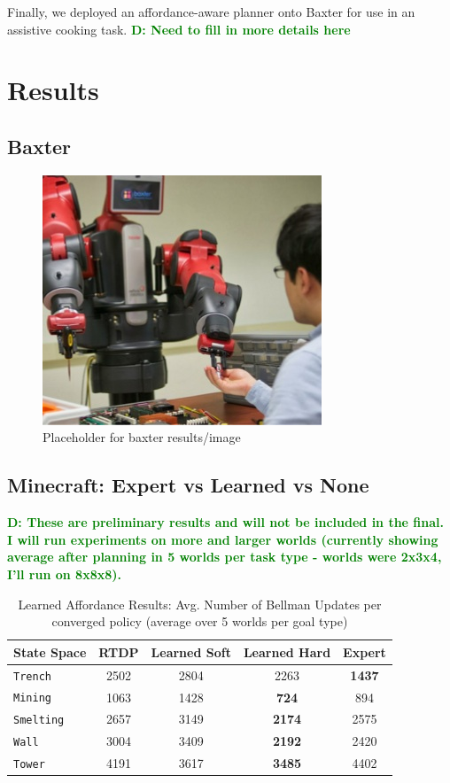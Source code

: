 \documentclass[conference]{IEEEtran}
\newcommand{\dnote}[1]{\textcolor{Green}{\textbf{D: #1}}}
\begin{document}
Finally, we deployed an affordance-aware planner onto Baxter for use in an assistive cooking task. \dnote{Need to fill in more details here}

\section{Results}
\label{sec:results}

\subsection{Baxter}

\begin{figure}[H]
\centering
\includegraphics[scale=0.195]{figures/baxter_temp.jpg}%
  \caption{Placeholder for baxter results/image}
  \label{fig:baxter_results}
\end{figure}

\subsection{Minecraft: Expert vs Learned vs None}

\dnote{These are preliminary results and will not be included in the final. I will run experiments on more and larger worlds (currently showing average after planning in 5 worlds per task type - worlds were 2x3x4, I'll run on 8x8x8).}


\begin{table}[H]
\centering
\begin{tabular}{ l || c c c c }
  State Space & RTDP & Learned Soft & Learned Hard & Expert 	 	\\ \hline
  \texttt{Trench}  	& 	2502	&	2804		&	2263	&	{\bf 1437}	\\
  \texttt{Mining}  	& 	1063	&	1428		&	{\bf 724}	&	894  \\
  \texttt{Smelting}  	& 	2657	&	3149		&	{\bf 2174}	&	2575  \\
  \texttt{Wall}  		& 	3004	&	3409		&	{\bf 2192}	&	2420\\
  \texttt{Tower}  		& 	4191	&	3617		&	{\bf 3485}	&	4402 \\
\end{tabular}
\caption{Learned Affordance Results: Avg. Number of Bellman Updates per converged policy (average over 5 worlds per goal type)}
\label{table:minecraft_results_bellman}
\end{table}
\end{document}

